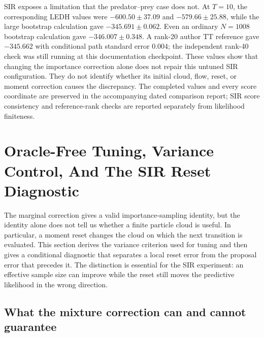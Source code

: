 SIR exposes a limitation that the predator--prey case does not.  At $T=10$,
the corresponding LEDH values were $-600.50\pm37.09$ and
$-579.66\pm25.88$, while the large bootstrap calculation gave
$-345.691\pm0.062$.  Even an ordinary $N=1008$ bootstrap calculation gave
$-346.007\pm0.348$.  A rank-20 author TT reference gave $-345.662$ with
conditional path standard error $0.004$; the independent rank-40 check was
still running at this documentation checkpoint.  These values show that
changing the importance correction alone does not repair this untuned SIR
configuration.  They do not identify whether its initial cloud, flow,
reset, or moment correction causes the discrepancy.  The completed values
and every score coordinate are preserved in the accompanying dated comparison
report; SIR score consistency and reference-rank checks are reported separately
from likelihood finiteness.



\section[Oracle-free tuning and the SIR reset diagnostic]{Oracle-Free Tuning, Variance Control, And The SIR Reset Diagnostic}
\label{sec:bf-hd-oracle-free-sir-tuning}

The marginal correction gives a valid importance-sampling identity, but the
identity alone does not tell us whether a finite particle cloud is useful.  In
particular, a moment reset changes the cloud on which the next transition is
evaluated.  This section derives the variance criterion used for tuning and
then gives a conditional diagnostic that separates a local reset error from
the proposal error that precedes it.  The distinction is essential for the
SIR experiment: an effective sample size can improve while the reset still
moves the predictive likelihood in the wrong direction.

\subsection{What the mixture correction can and cannot guarantee}

